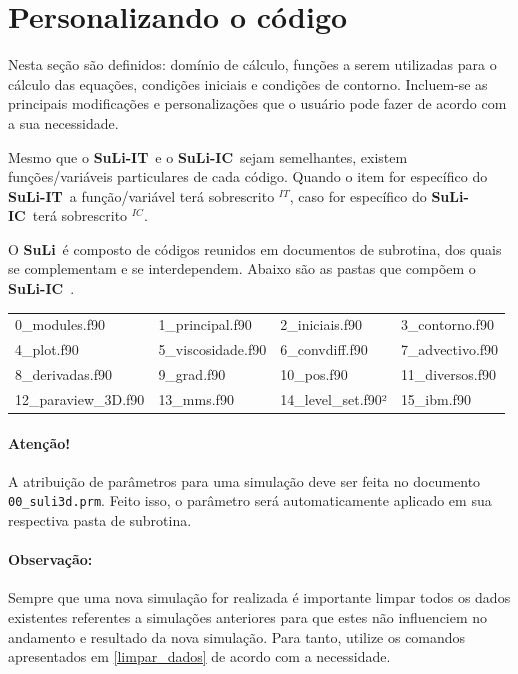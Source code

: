 \documentclass[12pt, a4paper]{article}
\newcommand{\SL}{{\bf SuLi}}
\newcommand{\SLIT}{{\bf SuLi-IT}}
\newcommand{\SLIC}{{\bf SuLi-IC}}
\begin{document}
\section{Personalizando o código}	\label{utilizando_o_codigo}

Nesta seção são definidos: domínio de cálculo, funções a serem utilizadas para o cálculo das equações, condições iniciais e condições de contorno. Incluem-se as principais modificações e personalizações que o usuário pode fazer de acordo com a sua necessidade.

Mesmo que o \SLIT\ e o \SLIC\ sejam semelhantes, existem funções/variáveis particulares de cada código. Quando o item for específico do \SLIT\ a função/variável terá sobrescrito $^{IT}$, caso for específico do \SLIC\ terá sobrescrito $^{IC}$.

O \SL\ é composto de códigos reunidos em documentos de subrotina, dos quais se complementam e se interdependem. Abaixo são as pastas que compõem o \SLIC\ .

\begin{table}[htb]
	\begin{center}
		\begin{tabular}{llll}
		0\_modules.f90 & 1\_principal.f90 & 2\_iniciais.f90 & 3\_contorno.f90 \\
		4\_plot.f90  & 5\_viscosidade.f90 & 6\_convdiff.f90 & 7\_advectivo.f90 \\
		8\_derivadas.f90 & 9\_grad.f90 & 10\_pos.f90 & 11\_diversos.f90 \\
		12\_paraview\_3D.f90 & 13\_mms.f90 & 14\_level\_set.f90² & 15\_ibm.f90
		\end{tabular}		
	\end{center}
\end{table}

\paragraph{Atenção!} A atribuição de parâmetros para uma simulação deve ser feita no documento \,\verb|00_suli3d.prm|. Feito isso, o parâmetro será automaticamente aplicado em sua respectiva pasta de subrotina.

\paragraph{Observação:} Sempre que uma nova simulação for realizada é importante limpar todos os dados existentes referentes a simulações anteriores para que estes não influenciem no andamento e resultado da nova simulação. Para tanto, utilize os comandos apresentados em \ref{limpar_dados} de acordo com a necessidade.
\end{document}
